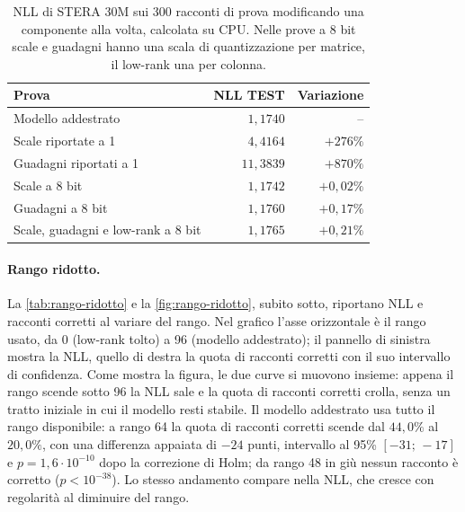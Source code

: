 \begin{table}[H]
\centering
\small
\begin{tabular}{lrr}
\toprule
Prova & NLL TEST & Variazione \\
\midrule
Modello addestrato & $1{,}1740$ & -- \\
\rowcolor{steraArancio!12} Scale riportate a 1 & $4{,}4164$ & $+276\%$ \\
\rowcolor{steraArancio!12} Guadagni riportati a 1 & $11{,}3839$ & $+870\%$ \\
Scale a 8 bit & $1{,}1742$ & $+0{,}02\%$ \\
Guadagni a 8 bit & $1{,}1760$ & $+0{,}17\%$ \\
Scale, guadagni e low-rank a 8 bit & $1{,}1765$ & $+0{,}21\%$ \\
\bottomrule
\end{tabular}
\caption{NLL di STERA 30M sui 300 racconti di prova modificando una componente alla volta, calcolata su CPU. Nelle prove a 8 bit scale e guadagni hanno una scala di quantizzazione per matrice, il low-rank una per colonna.}
\label{tab:ablazioni-scale-guadagni}
\end{table}

\paragraph{Rango ridotto.} La \autoref{tab:rango-ridotto} e la \autoref{fig:rango-ridotto}, subito sotto, riportano NLL e racconti corretti al variare del rango. Nel grafico l'asse orizzontale è il rango usato, da 0 (low-rank tolto) a 96 (modello addestrato); il pannello di sinistra mostra la NLL, quello di destra la quota di racconti corretti con il suo intervallo di confidenza. Come mostra la figura, le due curve si muovono insieme: appena il rango scende sotto 96 la NLL sale e la quota di racconti corretti crolla, senza un tratto iniziale in cui il modello resti stabile. Il modello addestrato usa tutto il rango disponibile: a rango 64 la quota di racconti corretti scende dal $44{,}0\%$ al $20{,}0\%$, con una differenza appaiata di $-24$ punti, intervallo al 95\% $[-31;\,-17]$ e $p=1{,}6\cdot10^{-10}$ dopo la correzione di Holm; da rango 48 in giù nessun racconto è corretto ($p<10^{-38}$). Lo stesso andamento compare nella NLL, che cresce con regolarità al diminuire del rango.

